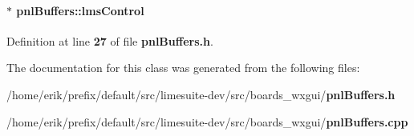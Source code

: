 \paragraph[{lms\+Control}]{$\ast$ pnl\+Buffers\+::lms\+Control\hspace{0.3cm}{\ttfamily [protected]}}\label{classpnlBuffers_ad7067896082d71209a1bb11d90c06050}


Definition at line {\bf 27} of file {\bf pnl\+Buffers.\+h}.



The documentation for this class was generated from the following files\+:\begin{DoxyCompactItemize}
\item 
/home/erik/prefix/default/src/limesuite-\/dev/src/boards\+\_\+wxgui/{\bf pnl\+Buffers.\+h}\item 
/home/erik/prefix/default/src/limesuite-\/dev/src/boards\+\_\+wxgui/{\bf pnl\+Buffers.\+cpp}\end{DoxyCompactItemize}
